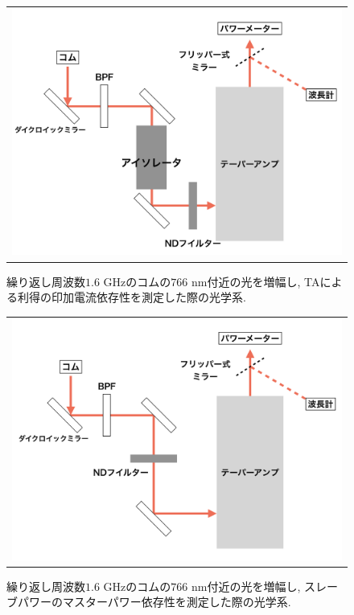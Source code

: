 \documentclass[uplatex, dvipdfmx, a4paper, report, papersize, 11pt]{jsbook}
\begin{document}
\begin{figure}[H]
  \centering
    \begin{tabular}{c}
      \begin{minipage}{1\hsize}
        \centering
          \includegraphics[keepaspectratio,  scale=0.35,  angle=0]
          {figures/chapter4/astro_amp_diagram_isolator.png}
          \caption{繰り返し周波数$1.6$ GHzのコムの$766$ nm付近の光を増幅し, TAによる利得の印加電流依存性を測定した際の光学系. }
          \label{astro_amp_diagram_isolator}
      \end{minipage}
    \end{tabular}
\end{figure}
\begin{figure}[H]
  \centering
    \begin{tabular}{c}
      \begin{minipage}{1\hsize}
        \centering
          \includegraphics[keepaspectratio,  scale=0.35,  angle=0]
          {figures/chapter4/760_astro_amp_diagram.png}
          \caption{繰り返し周波数$1.6$ GHzのコムの$766$ nm付近の光を増幅し, スレーブパワーのマスターパワー依存性を測定した際の光学系. }
          \label{760_astro_amp_diagram}
      \end{minipage}
    \end{tabular}
\end{figure}
\end{document}
